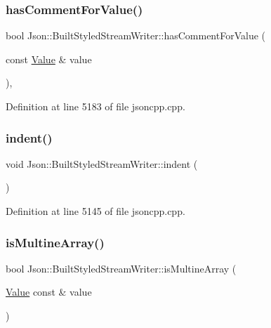 \subsubsection{\texorpdfstring{has\+Comment\+For\+Value()}{hasCommentForValue()}}
{\footnotesize\ttfamily bool Json\+::\+Built\+Styled\+Stream\+Writer\+::has\+Comment\+For\+Value (\begin{DoxyParamCaption}\item[{const \hyperlink{class_json_1_1_value}{Value} \&}]{value }\end{DoxyParamCaption})\hspace{0.3cm}{\ttfamily [static]}, {\ttfamily [private]}}



Definition at line 5183 of file jsoncpp.\+cpp.

\hypertarget{struct_json_1_1_built_styled_stream_writer_a73e09692a2cfbd6e67836b060dc34a9f}{}\label{struct_json_1_1_built_styled_stream_writer_a73e09692a2cfbd6e67836b060dc34a9f} 
\subsubsection{\texorpdfstring{indent()}{indent()}}
{\footnotesize\ttfamily void Json\+::\+Built\+Styled\+Stream\+Writer\+::indent (\begin{DoxyParamCaption}{ }\end{DoxyParamCaption})\hspace{0.3cm}{\ttfamily [private]}}



Definition at line 5145 of file jsoncpp.\+cpp.

\hypertarget{struct_json_1_1_built_styled_stream_writer_af423fd33b3d580506ea3efc53b05a077}{}\label{struct_json_1_1_built_styled_stream_writer_af423fd33b3d580506ea3efc53b05a077} 
\subsubsection{\texorpdfstring{is\+Multine\+Array()}{isMultineArray()}}
{\footnotesize\ttfamily bool Json\+::\+Built\+Styled\+Stream\+Writer\+::is\+Multine\+Array (\begin{DoxyParamCaption}\item[{\hyperlink{class_json_1_1_value}{Value} const \&}]{value }\end{DoxyParamCaption})\hspace{0.3cm}{\ttfamily [private]}}



